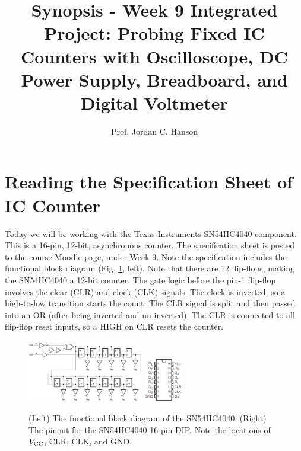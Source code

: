 \documentclass{article}
\begin{document}
\title{Synopsis - Week 9 Integrated Project: Probing Fixed IC Counters with Oscilloscope, DC Power Supply, Breadboard, and Digital Voltmeter}
\author{Prof. Jordan C. Hanson}

\maketitle

\section{Reading the Specification Sheet of IC Counter}

Today we will be working with the Texas Instruments SN54HC4040 component.  This is a 16-pin, 12-bit, asynchronous counter.  The specification sheet is posted to the course Moodle page, under Week 9.  Note the specification includes the functional block diagram (Fig. \ref{fig:count1}, left).  Note that there are 12 flip-flops, making the SN54HC4040 a 12-bit counter.  The gate logic before the pin-1 flip-flop involves the clear (CLR) and clock (CLK) signals.  The clock is inverted, so a high-to-low transition starts the count.  The CLR signal is split and then passed into an OR (after being inverted and un-inverted).  The CLR is connected to all flip-flop reset inputs, so a HIGH on CLR resets the counter.

\begin{figure}[ht]
\centering
\includegraphics[width=0.45\textwidth]{counter_1.png} \hspace{1cm}
\includegraphics[width=0.15\textwidth]{counter_2.png}
\caption{\label{fig:count1} (Left) The functional block diagram of the SN54HC4040. (Right) The pinout for the SN54HC4040 16-pin DIP.  Note the locations of $V_{\rm CC}$, CLR, CLK, and GND.}
\end{figure}
\end{document}
